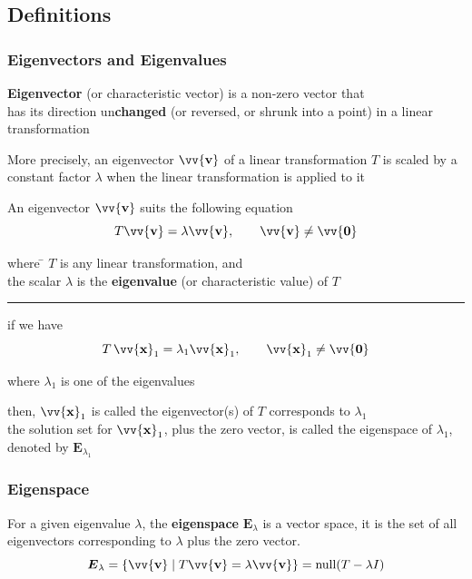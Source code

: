 \documentclass[11pt]{article}
\DeclareRobustCommand{\myvec}[1]{\vv{\mathbf{#1}}}
\newcommand{\mysubvecsp}[1]{\bm{{#1}}}
\newcommand{\mymat}[1]{#1}
\begin{document}
    \subsection{Definitions}
    \subsubsection{Eigenvectors and Eigenvalues}
    \textbf{Eigenvector} (or characteristic vector) is a non-zero vector that \\
    has its direction un\large \textbf{changed} (or reversed, or shrunk into a point) in a linear transformation
    \vspace{\belowdisplayshortskip}

    More precisely, an eigenvector $\myvec{v}$ of a linear transformation $\mymat{T}$ is scaled by a constant factor $\lambda$ when the linear transformation is applied to it
    \vspace{\belowdisplayshortskip}

    \noindent
    \begin{minipage}{\linewidth}
        An eigenvector $\myvec{v}$ suits the following equation
        \begin{equation}
            \mymat{T}\myvec{v} = \lambda\myvec{v}, \qquad \myvec{v} \ne \myvec{0}
        \end{equation} 
        \begin{tabbing}
            where \= $\mymat{T}$ is any linear transformation, and\\
            \> the scalar $\lambda$ is the \textbf{eigenvalue} (or characteristic value) of $\mymat{T}$ 
        \end{tabbing}
    \end{minipage}
    \hbox{}

    \noindent \rule{\textwidth}{0.1pt}    
    if we have
    \[ \mymat{T}\,\myvec{x}_1 = \lambda_1 \myvec{x}_1, \qquad \myvec{x}_1 \ne \myvec{0} \]
    \begin{center}
        where $\lambda_1$ is one of the eigenvalues
    \end{center}
    then, $\myvec{x}_1$ is called the eigenvector(s) of $\mymat{T}$ corresponds to $\lambda_1$\\
    the solution set for $\myvec{x}_1$, plus the zero vector, is called the eigenspace of $\lambda_1$, denoted by $\mysubvecsp{E}_{\lambda_1}$
    

    \subsubsection{Eigenspace}
    For a given eigenvalue $\lambda$, the \textbf{eigenspace} $\mysubvecsp{E}_\lambda$ is a vector space, it is the set of all eigenvectors corresponding to $\lambda$ plus the zero vector. 
    \begin{equation}
        \mysubvecsp{E}_\lambda = \{ \myvec{v} \mid \mymat{T}\myvec{v} = \lambda\myvec{v} \} = \text{null}(\mymat{T}-\lambda \mymat{I})
    \end{equation}
\end{document}
